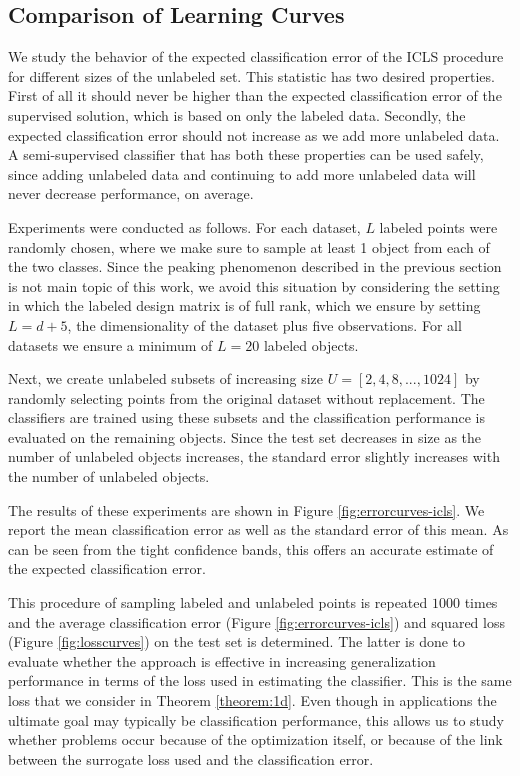 \documentclass[twoside]{memoir}\usepackage[]{graphicx}\usepackage{xcolor}
\newcommand{\featdim}{d}
\newcommand{\Nunl}{U}
\newcommand{\Nlab}{L}
\begin{document}
\subsection{Comparison of Learning Curves}
We study the behavior of the expected classification error of the ICLS procedure for different sizes of the unlabeled set. This statistic has two desired properties. First of all it should never be higher than the expected classification error of the supervised solution, which is based on only the labeled data. Secondly, the expected classification error should not increase as we add more unlabeled data. A semi-supervised classifier that has both these properties can be used safely, since adding unlabeled data and continuing to add more unlabeled data will never decrease performance, on average. 

Experiments were conducted as follows. For each dataset, $\Nlab$ labeled points were randomly chosen, where we make sure to sample at least 1 object from each of the two classes. Since the peaking phenomenon described in the previous section is not main topic of this work, we avoid this situation by considering the setting in which the labeled design matrix is of full rank, which we ensure by setting $\Nlab=\featdim+5$, the dimensionality of the dataset plus five observations. For all datasets we ensure a minimum of $\Nlab=20$ labeled objects.

Next, we create unlabeled subsets of increasing size $\Nunl=[2,4,8,...,1024]$ by randomly selecting points from the original dataset without replacement. The classifiers are trained using these subsets and the classification performance is evaluated on the remaining objects. Since the test set decreases in size as the number of unlabeled objects increases, the standard error slightly increases with the number of unlabeled objects.

The results of these experiments are shown in Figure \ref{fig:errorcurves-icls}. We report the mean classification error as well as the standard error of this mean. As can be seen from the tight confidence bands, this offers an accurate estimate of the expected classification error.

This procedure of sampling labeled and unlabeled points is repeated $1000$ times and the average classification error (Figure \ref{fig:errorcurves-icls}) and squared loss (Figure \ref{fig:losscurves}) on the test set is determined. The latter is done to evaluate whether the approach is effective in increasing generalization performance in terms of the loss used in estimating the classifier. This is the same loss that we consider in Theorem \ref{theorem:1d}. Even though in applications the ultimate goal may typically be classification performance, this allows us to study whether problems occur because of the optimization itself, or because of the link between the surrogate loss used and the classification error.
\end{document}
